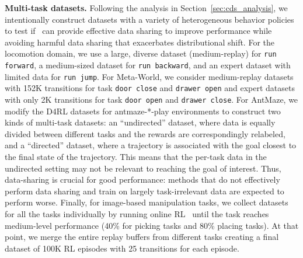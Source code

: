 \textbf{Multi-task datasets.}  Following the analysis in Section~\ref{sec:cds_analysis}, we intentionally construct datasets with a variety of heterogeneous behavior policies to test if \cdsmethodname\ can provide effective data sharing to improve performance while avoiding harmful data sharing that exacerbates distributional shift. For the locomotion domain, we use a large, diverse dataset (medium-replay) for \texttt{run forward}, a medium-sized dataset for \texttt{run backward}, and an expert dataset with limited data for \texttt{run jump}. For Meta-World, we consider medium-replay datasets with 152K transitions for task \texttt{door close} and \texttt{drawer open} and expert datasets with only 2K transitions for task \texttt{door open} and \texttt{drawer close}. For AntMaze, we modify the D4RL datasets for antmaze-*-play environments to construct two kinds of multi-task datasets: an ``undirected'' dataset, where data is equally divided between different tasks and the rewards are correspondingly relabeled, and a ``directed'' dataset, where a trajectory is associated with the goal closest to the final state of the trajectory. This means that the per-task data in the undirected setting may not be relevant to reaching the goal of interest. Thus, data-sharing is crucial for good performance: methods that do not effectively perform data sharing and train on largely task-irrelevant data are expected to perform worse. Finally, for image-based manipulation tasks, we collect datasets for all the tasks individually by running online RL~\cite{kalashnikov2018scalable} until the task reaches medium-level performance (40\% for picking tasks and 80\% placing tasks). At that point, we merge the entire replay buffers from different tasks creating a final dataset of 100K RL episodes with 25 transitions for each episode.

